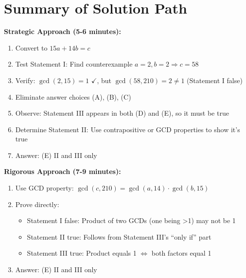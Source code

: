 \documentclass[12pt]{article}
\begin{document}
\section*{Summary of Solution Path}

\textbf{Strategic Approach (5-6 minutes):}
\begin{enumerate}
    \item Convert to $15a + 14b = c$
    \item Test Statement I: Find counterexample $a=2, b=2 \Rightarrow c=58$
    \item Verify: $\gcd(2,15)=1$ $\checkmark$, but $\gcd(58,210)=2 \neq 1$ (Statement I false)
    \item Eliminate answer choices (A), (B), (C)
    \item Observe: Statement III appears in both (D) and (E), so it must be true
    \item Determine Statement II: Use contrapositive or GCD properties to show it's true
    \item Answer: (E) II and III only
\end{enumerate}

\textbf{Rigorous Approach (7-9 minutes):}
\begin{enumerate}
    \item Use GCD property: $\gcd(c,210) = \gcd(a,14) \cdot \gcd(b,15)$
    \item Prove directly:
    \begin{itemize}
        \item Statement I false: Product of two GCDs (one being >1) may not be 1
        \item Statement II true: Follows from Statement III's ``only if'' part
        \item Statement III true: Product equals 1 $\Leftrightarrow$ both factors equal 1
    \end{itemize}
    \item Answer: (E) II and III only
\end{enumerate}
\end{document}
